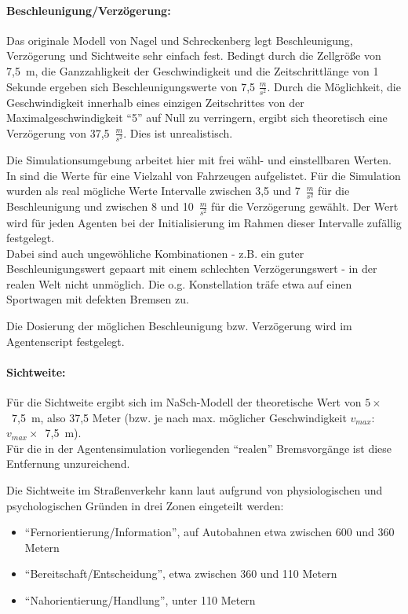 \paragraph*{Beschleunigung/Verzögerung:}
\label{beschl-verz}
Das originale Modell von Nagel und Schreckenberg legt Beschleunigung, Verzögerung und Sichtweite sehr einfach fest.
Bedingt durch die Zellgröße von \mbox{7,5 m}, die Ganzzahligkeit der Geschwindigkeit und die Zeitschrittlänge von 1 Sekunde ergeben sich Beschleunigungswerte von 7,5 $\frac{m}{s^{2}}$. 
Durch die Möglichkeit, die Geschwindigkeit innerhalb eines einzigen Zeitschrittes von der Maximalgeschwindigkeit \enquote{5} auf Null zu verringern, ergibt sich theoretisch eine Verzögerung von \mbox{37,5 $\frac{m}{s^{2}}$}.
Dies ist unrealistisch.

Die Simulationsumgebung arbeitet hier mit frei wähl- und einstellbaren Werten. 
In \cite{unfallrekonstruktion} sind die Werte für eine Vielzahl von Fahrzeugen aufgelistet. 
Für die Simulation wurden als real mögliche Werte Intervalle zwischen 3,5 und \mbox{7 $\frac{m}{s^{2}}$} für die Beschleunigung und zwischen 8 und \mbox{10 $\frac{m}{s^{2}}$} für die Verzögerung gewählt.
Der Wert wird für jeden Agenten bei der Initialisierung im Rahmen dieser Intervalle zufällig festgelegt.
\\
Dabei sind auch ungewöhliche Kombinationen - z.B. ein guter Beschleunigungswert gepaart mit einem schlechten Verzögerungswert - in der realen Welt nicht unmöglich.
Die o.g. Konstellation träfe etwa auf einen Sportwagen mit defekten Bremsen zu.

Die Dosierung der möglichen Beschleunigung bzw. Verzögerung wird im Agentenscript festgelegt.

\paragraph*{Sichtweite:}
\label{sec:sichtweite}
Für die Sichtweite ergibt sich im NaSch-Modell der theoretische Wert von \mbox{$ 5 \times $ 7,5 m}, also 37,5 Meter (bzw. je nach max. möglicher Geschwindigkeit  $ v_{max} $: \mbox{$ v_{max} \times $ 7,5 m}).
\\
Für die in der Agentensimulation vorliegenden \enquote{realen} Bremsvorgänge ist diese Entfernung unzureichend. 

Die Sichtweite im Straßenverkehr kann laut \cite{sichtweite} aufgrund von physiologischen und psychologischen Gründen in drei Zonen eingeteilt werden:
\begin{itemize}
\itemsep0em
	\item \enquote{Fernorientierung/Information}, auf Autobahnen etwa zwischen 600 und 360 Metern
	\item \enquote{Bereitschaft/Entscheidung}, etwa zwischen 360 und 110 Metern
	\item \enquote{Nahorientierung/Handlung}, unter 110 Metern
\end{itemize}


